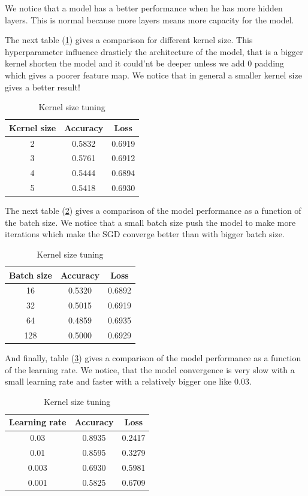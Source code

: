 \documentclass[a4paper]{article}
\begin{document}
We notice that a model has a better performance when he has more hidden layers. This is normal because more layers means more capacity for the model.

The next table (\ref{table:2}) gives a comparison for different kernel size. This hyperparameter influence drasticly the architecture of the model, that is a bigger kernel shorten the model and it could'nt be deeper unless we add 0 padding which gives a poorer feature map. We notice that in general a smaller kernel size gives a better result!

\begin{table}[h!]
	\centering
	\begin{tabular}{||c c c||} 
		\hline
		Kernel size & Accuracy & Loss \\ [0.5ex] 
		\hline\hline
		2 & 0.5832 & 0.6919 \\ 
		3 & 0.5761 & 0.6912 \\ 
		4 & 0.5444 & 0.6894 \\ 
		5 & 0.5418 & 0.6930 \\ [1ex]  
		\hline
	\end{tabular}
	\caption{Kernel size tuning}
	\label{table:2}
\end{table}

The next table (\ref{table:3}) gives a comparison of the model performance as a function of the batch size. We notice that a small batch size push the model to make more iterations which make the SGD converge better than with bigger batch size.

\begin{table}[h!]
	\centering
	\begin{tabular}{||c c c||} 
		\hline
		Batch size & Accuracy & Loss \\ [0.5ex] 
		\hline\hline
		16 & 0.5320 & 0.6892 \\ 
		32 & 0.5015 & 0.6919 \\ 
		64 & 0.4859 & 0.6935 \\ 
		128 & 0.5000 & 0.6929 \\ [1ex]  
		\hline
	\end{tabular}
	\caption{Kernel size tuning}
	\label{table:3}
\end{table}

And finally, table (\ref{table:4}) gives a comparison of the model performance as a function of the learning rate. We notice, that the model convergence is very slow with a small learning rate and faster with a relatively bigger one like 0.03.

\begin{table}[h!]
	\centering
	\begin{tabular}{||c c c||} 
		\hline
		Learning rate & Accuracy & Loss \\ [0.5ex] 
		\hline\hline
		0.03 & 0.8935 & 0.2417 \\ 
		0.01 & 0.8595 & 0.3279 \\ 
		0.003 & 0.6930 & 0.5981 \\
		0.001 & 0.5825 & 0.6709 \\ [1ex]  
		\hline
	\end{tabular}
	\caption{Kernel size tuning}
	\label{table:4}
\end{table}
\end{document}
